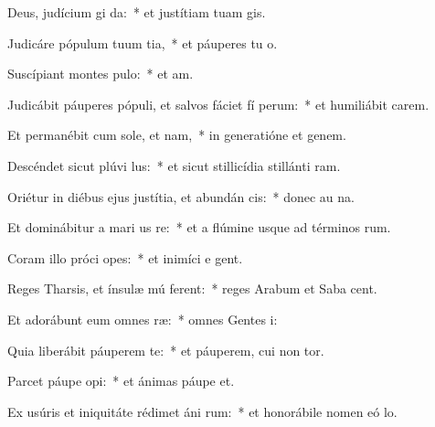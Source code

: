 \item Deus, judícium  gi da:~* et justítiam tuam  gis.
\item Judicáre pópulum tuum  tia,~* et páuperes tu  o.
\item Suscípiant montes  pulo:~* et  am.
\item Judicábit páuperes pópuli, et salvos fáciet fí perum:~* et humiliábit carem.
\item Et permanébit cum sole, et  nam,~* in generatióne et genem.
\item Descéndet sicut plúvi  lus:~* et sicut stillicídia stillánti  ram.
\item Oriétur in diébus ejus justítia, et abundán cis:~* donec au na.
\item Et dominábitur a mari us  re:~* et a flúmine usque ad términos  rum.
\item Coram illo próci opes:~* et inimíci e  gent.
\item Reges Tharsis, et ínsulæ mú ferent:~* reges Arabum et Saba  cent.
\item Et adorábunt eum omnes  ræ:~* omnes Gentes  i:
\item Quia liberábit páuperem  te:~* et páuperem, cui non  tor.
\item Parcet páupe  opi:~* et ánimas páupe  et.
\item Ex usúris et iniquitáte rédimet áni rum:~* et honorábile nomen eó  lo.
